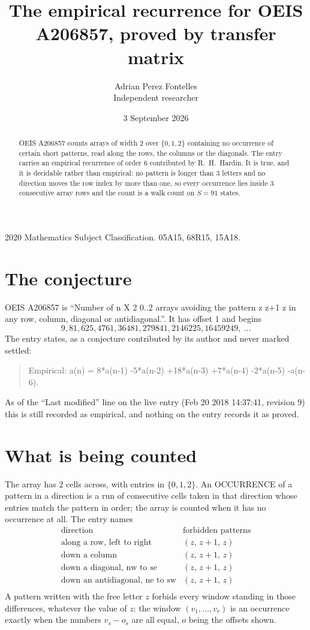 \documentclass[11pt,a4paper]{article}
\title{The empirical recurrence for OEIS A206857, proved by transfer matrix}
\author{Adrian Perez Fontelles\\ \small Independent researcher}
\date{3 September 2026}
\theoremstyle{plain}
\theoremstyle{definition}
\begin{document}
\maketitle

\begin{abstract}
OEIS A206857 counts arrays of width $2$ over $\{0,1,2\}$ containing no occurrence of certain short
patterns, read along the rows, the columns or the diagonals. The entry carries an empirical
recurrence of order $6$ contributed by R.~H.~Hardin. It is true, and it is decidable
rather than empirical: no pattern is longer than $3$ letters and no direction moves the row
index by more than one, so every occurrence lies inside $3$ consecutive array rows and the
count is a walk count on $S=91$ states.
\end{abstract}

\noindent\small 2020 Mathematics Subject Classification. 05A15, 68R15, 15A18.\normalsize

\section{The conjecture}

OEIS A206857 is ``Number of n X 2 0..2 arrays avoiding the pattern z z+1 z in any row, column, diagonal or antidiagonal.''. It has offset $1$ and begins
\[
9, 81, 625, 4761, 36481, 279841, 2146225, 16459249,\ \dots
\]
The entry states, as a conjecture contributed by its author and never marked settled:
\begin{quote}
Empirical: a(n) = 8*a(n-1) -5*a(n-2) +18*a(n-3) +7*a(n-4) -2*a(n-5) -a(n-6).
\end{quote}
As of the ``Last modified'' line on the live entry (Feb 20 2018 14:37:41, revision 9) this is still
recorded as empirical, and nothing on the entry records it as proved.

\section{What is being counted}

The array has $2$ cells across, with entries in $\{0,1,2\}$. An OCCURRENCE of a pattern in a
direction is a run of consecutive cells taken in that direction whose entries match the pattern
in order; the array is counted when it has no occurrence at all. The entry names
\[
\begin{array}{ll}
\text{direction} & \text{forbidden patterns} \\[2pt]
\text{along a row, left to right} & (z,\,z+1,\,z) \\
\text{down a column} & (z,\,z+1,\,z) \\
\text{down a diagonal, nw to se} & (z,\,z+1,\,z) \\
\text{down an antidiagonal, ne to sw} & (z,\,z+1,\,z) \\
\end{array}
\]
 A pattern written with the free letter $z$ forbids every window standing in those differences, whatever the value of $z$: the window $(v_1,\dots,v_r)$ is an occurrence exactly when the numbers $v_s-o_s$ are all equal, $o$ being the offsets shown.
\end{document}
